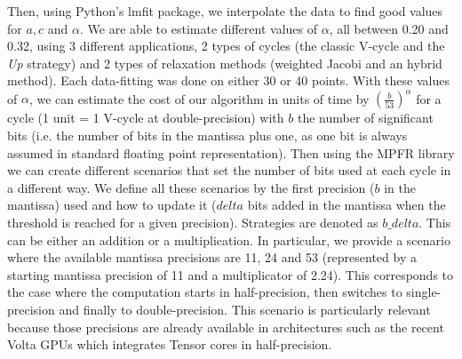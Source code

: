 Then, using Python's lmfit package, we interpolate the data to find good values
for $a,c$ and $\alpha$. We are able to estimate different values of $\alpha$,
all between 0.20 and 0.32, using 3 different applications, 2 types of cycles
(the classic V-cycle and the \emph{Up} strategy) and 2 types of relaxation
methods (weighted Jacobi and an hybrid method).  Each data-fitting was done on
either 30 or 40 points.  With these values of $\alpha$, we can estimate the
cost of our algorithm in units of time by $\left(\frac{b}{53}\right)^\alpha$
for a cycle (1 unit = 1 V-cycle at double-precision) with $b$ the number of
significant bits (i.e. the number of bits in the mantissa plus one, as one bit
is always assumed in standard floating point representation). Then using the
MPFR library we can create different scenarios that set the number of bits used
at each cycle in a different way. We define all these scenarios by the first
precision ($b$ in the mantissa) used and how to update it ($delta$ bits added
in the mantissa when the threshold is reached for a given precision).
Strategies are denoted as $b\_delta$. This can be either an addition or a
multiplication. In particular, we provide a scenario where the available
mantissa precisions are 11, 24 and 53 (represented by a starting mantissa
precision of 11 and a multiplicator of 2.24). This corresponds to the case
where the computation starts in half-precision, then switches to
single-precision and finally to double-precision. This scenario is particularly
relevant because those precisions are already available in architectures such
as the recent Volta GPUs which integrates Tensor cores in half-precision.


